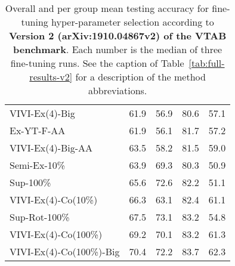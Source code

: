 \documentclass[10pt,twocolumn,letterpaper]{article}
\begin{document}
{\begin{table*}[h!]
\begin{tabular}{lrrrr}
VIVI-Ex(4)-Big          &     61.9 &     56.9 &        80.6 &       57.1 \\
Ex-YT-F-AA              &     61.9 &     56.1 &        81.7 &       57.2 \\
VIVI-Ex(4)-Big-AA       &     63.5 &     58.2 &        81.5 &       59.0 \\
Semi-Ex-10\%             &     63.9 &     69.3 &        80.3 &       50.9 \\
Sup-100\%                &     65.6 &     72.6 &        82.2 &       51.1 \\
VIVI-Ex(4)-Co(10\%)      &     66.3 &     63.1 &        82.4 &       61.1 \\
Sup-Rot-100\%            &     67.5 &     73.1 &        83.2 &       54.8 \\
VIVI-Ex(4)-Co(100\%)     &     69.2 &     70.1 &        83.2 &       61.3 \\
VIVI-Ex(4)-Co(100\%)-Big &     70.4 &     72.2 &        83.7 &       62.3 \\
\bottomrule
\end{tabular}     \caption{Overall and per group mean testing accuracy for fine-tuning hyper-parameter selection according to {\bf Version 2 (arXiv:1910.04867v2) of the VTAB benchmark}. Each number is the median of three fine-tuning runs. See the caption of Table~\ref{tab:full-results-v2} for a description of the method abbreviations.}
    \label{tab:per-group-results-v2}
\end{table*}


}
\end{document}

